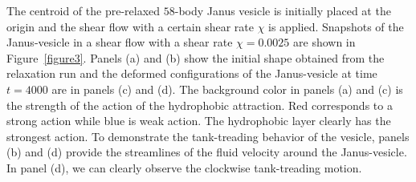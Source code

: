 \documentclass[lineno]{jfm}
\begin{document}
The centroid of the pre-relaxed $58$-body Janus vesicle is initially
placed at the origin and the shear flow with a certain shear rate $\chi$
is applied. Snapshots of the Janus-vesicle in a shear flow with a shear
rate $\chi=0.0025$ are shown in Figure~\ref{figure3}. Panels (a) and (b)
show the initial shape obtained from the relaxation run and the deformed
configurations of the Janus-vesicle at time $t=4000$ are in panels (c)
and (d). The background color in panels (a) and (c) is the strength of
the action of the hydrophobic attraction. Red corresponds to a strong
action while blue is weak action. The hydrophobic layer clearly has the
strongest action. To demonstrate the tank-treading behavior of the
vesicle, panels (b) and (d) provide the streamlines of the fluid
velocity around the Janus-vesicle. In panel (d), we can clearly observe
the clockwise tank-treading motion.
\end{document}
